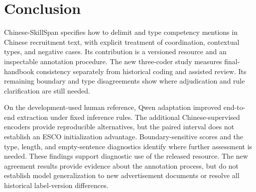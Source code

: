 \section{Conclusion}
\label{sec:conclusion}

Chinese-SkillSpan specifies how to delimit and type competency mentions in Chinese recruitment text, with explicit treatment of coordination, contextual types, and negative cases. Its contribution is a versioned resource and an inspectable annotation procedure. The new three-coder study measures final-handbook consistency separately from historical coding and assisted review. Its remaining boundary and type disagreements show where adjudication and rule clarification are still needed.

On the development-used human reference, Qwen adaptation improved end-to-end extraction under fixed inference rules. The additional Chinese-supervised encoders provide reproducible alternatives, but the paired interval does not establish an ESCO initialization advantage. Boundary-sensitive scores and the type, length, and empty-sentence diagnostics identify where further assessment is needed. These findings support diagnostic use of the released resource. The new agreement results provide evidence about the annotation process, but do not establish model generalization to new advertisement documents or resolve all historical label-version differences.

